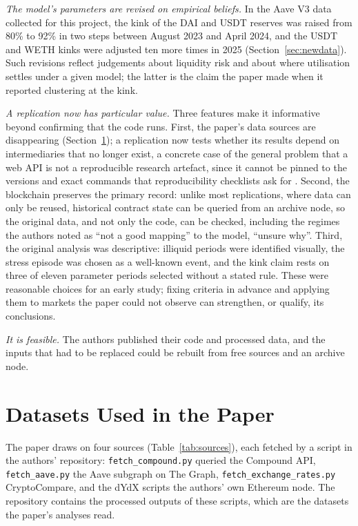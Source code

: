 \documentclass[11pt]{article}
\begin{document}
\emph{The model's parameters are revised on empirical beliefs.} In the Aave V3 data collected for this project, the kink of the DAI and USDT reserves was raised from 80\% to 92\% in two steps between August 2023 and April 2024, and the USDT and WETH kinks were adjusted ten more times in 2025 (Section~\ref{sec:newdata}). Such revisions reflect judgements about liquidity risk and about where utilisation settles under a given model; the latter is the claim the paper made when it reported clustering at the kink.

\emph{A replication now has particular value.} Three features make it informative beyond confirming that the code runs. First, the paper's data sources are disappearing (Section~\ref{sec:datasets}); a replication now tests whether its results depend on intermediaries that no longer exist, a concrete case of the general problem that a web API is not a reproducible research artefact, since it cannot be pinned to the versions and exact commands that reproducibility checklists ask for \citep{pineau2021improving}. Second, the blockchain preserves the primary record: unlike most replications, where data can only be reused, historical contract state can be queried from an archive node, so the original data, and not only the code, can be checked, including the regimes the authors noted as ``not a good mapping'' to the model, ``unsure why''. Third, the original analysis was descriptive: illiquid periods were identified visually, the stress episode was chosen as a well-known event, and the kink claim rests on three of eleven parameter periods selected without a stated rule. These were reasonable choices for an early study; fixing criteria in advance and applying them to markets the paper could not observe can strengthen, or qualify, its conclusions.

\emph{It is feasible.} The authors published their code and processed data, and the inputs that had to be replaced could be rebuilt from free sources and an archive node.

\section{Datasets Used in the Paper}
\label{sec:datasets}

The paper draws on four sources (Table~\ref{tab:sources}), each fetched by a script in the authors' repository: \texttt{fetch\_compound.py} queried the Compound API, \texttt{fetch\_aave.py} the Aave subgraph on The Graph, \texttt{fetch\_exchange\_rates.py} CryptoCompare, and the dYdX scripts the authors' own Ethereum node. The repository contains the processed outputs of these scripts, which are the datasets the paper's analyses read.
\end{document}
